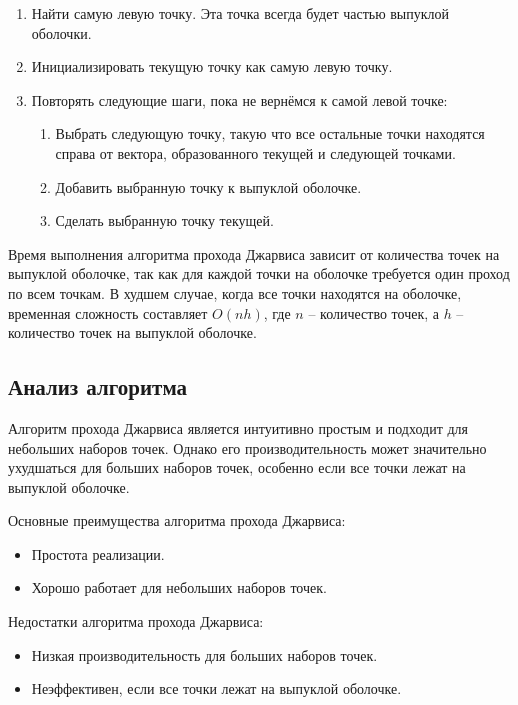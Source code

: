 \documentclass[]{article}
\theoremstyle{remark}
\theoremstyle{definition}
\begin{document}
\begin{enumerate}
    \item Найти самую левую точку. Эта точка всегда будет частью выпуклой оболочки.
    \item Инициализировать текущую точку как самую левую точку.
    \item Повторять следующие шаги, пока не вернёмся к самой левой точке:
    \begin{enumerate}
        \item Выбрать следующую точку, такую что все остальные точки находятся справа от вектора, образованного текущей и следующей точками.
        \item Добавить выбранную точку к выпуклой оболочке.
        \item Сделать выбранную точку текущей.
    \end{enumerate}
\end{enumerate}

\par Время выполнения алгоритма прохода Джарвиса зависит от количества точек на выпуклой оболочке, так как для каждой точки на оболочке требуется один проход по всем точкам. В худшем случае, когда все точки находятся на оболочке, временная сложность составляет \(O(nh)\), где \(n\) – количество точек, а \(h\) – количество точек на выпуклой оболочке.

\subsection{Анализ алгоритма}

\par Алгоритм прохода Джарвиса является интуитивно простым и подходит для небольших наборов точек. Однако его производительность может значительно ухудшаться для больших наборов точек, особенно если все точки лежат на выпуклой оболочке.

\par Основные преимущества алгоритма прохода Джарвиса:
\begin{itemize}
    \item Простота реализации.
    \item Хорошо работает для небольших наборов точек.
\end{itemize}

\par Недостатки алгоритма прохода Джарвиса:
\begin{itemize}
    \item Низкая производительность для больших наборов точек.
    \item Неэффективен, если все точки лежат на выпуклой оболочке.
\end{itemize}
\end{document}

